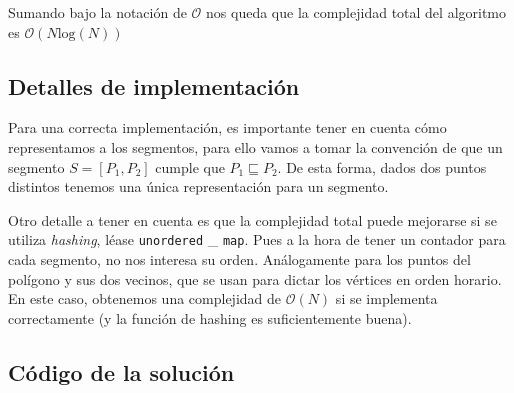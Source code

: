 Sumando bajo la notación de $\mathcal{O}$ nos queda que la complejidad total del algoritmo es $\mathcal{O}(N\text{log}(N))$



\subsection{Detalles de implementación}

Para una correcta implementación, es importante tener en cuenta cómo representamos a los segmentos, para ello vamos a tomar la convención de que un segmento $S = [P_1, P_2]$ cumple que $P_1 \sqsubseteq P_2$. De esta forma, dados dos puntos distintos tenemos una única representación para un segmento.

Otro detalle a tener en cuenta es que la complejidad total puede mejorarse si se utiliza \textit{hashing}, léase \texttt{unordered} \_ \texttt{map}. Pues a la hora de tener un contador para cada segmento, no nos interesa su orden. Análogamente para los puntos del polígono y sus dos vecinos, que se usan para dictar los vértices en orden horario.
 En este caso, obtenemos una complejidad de $\mathcal{O}(N)$ si se implementa correctamente (y la función de hashing es suficientemente buena).  


\newpage
\subsection{Código de la solución}
\lstset{inputencoding=utf8/latin1}


